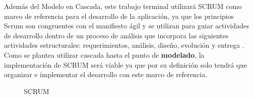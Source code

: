 Además del Modelo en Cascada, este trabajo terminal utilizará SCRUM como marco de referencia para el desarrollo de la aplicación, ya que los principios Scrum son congruentes con el manifiesto ágil y se utilizan para guiar actividades de desarrollo dentro de un proceso de análisis que incorpora las siguientes actividades estructurales: requerimientos, análisis, diseño, evolución y entrega \cite{MetodoCascada}. Como se plantea utilizar cascada hasta el punto de \textbf{modelado}, la implementación de SCRUM será viable ya que por su definición solo tendrá que organizar e implementar el desarrollo con este marco de referencia.

\begin{figure}[htbp!]
	\centering
	\caption{SCRUM}
	\label{fig:IntroduccionMetodologiaS}
\end{figure}
\newpage